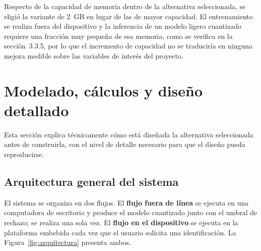 Respecto de la capacidad de memoria dentro de la alternativa seleccionada, se
eligió la variante de 2~GB en lugar de las de mayor capacidad. El
entrenamiento se realiza fuera del dispositivo y la inferencia de un modelo
ligero cuantizado requiere una fracción muy pequeña de esa memoria, como se
verifica en la sección~3.3.5, por lo que el incremento de capacidad no se
traduciría en ninguna mejora medible sobre las variables de interés del
proyecto.

\section{Modelado, cálculos y diseño detallado}

Esta sección explica técnicamente cómo está diseñada la alternativa
seleccionada antes de construirla, con el nivel de detalle necesario para que
el diseño pueda reproducirse.

\subsection{Arquitectura general del sistema}

El sistema se organiza en dos flujos. El \textbf{flujo fuera de línea} se
ejecuta en una computadora de escritorio y produce el modelo cuantizado junto
con el umbral de rechazo; se realiza una sola vez. El \textbf{flujo en el
dispositivo} se ejecuta en la plataforma embebida cada vez que el usuario
solicita una identificación. La Figura~\ref{fig:arquitectura} presenta ambos.

